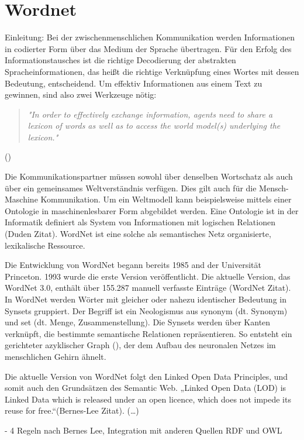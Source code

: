 \section{Wordnet}

Einleitung:
Bei der zwischenmenschlichen Kommunikation werden Informationen in codierter Form über das Medium der Sprache übertragen. Für den Erfolg des Informationstausches ist die richtige Decodierung der abstrakten Spracheinformationen, das heißt die richtige Verknüpfung eines Wortes mit dessen Bedeutung, entscheidend. Um effektiv Informationen aus einem Text zu gewinnen, sind also zwei Werkzeuge nötig:
\begin{quote} \textit{"In order to effectively exchange information, agents need to share a lexicon of words as well as to access the world model(s) underlying the lexicon."}\end{quote} (\cite[vgl.][1]{OLTRAMANI})

Die Kommunikationspartner müssen sowohl über denselben Wortschatz als auch über ein gemeinsames Weltverständnis verfügen. Dies gilt auch für die Mensch-Maschine Kommunikation. Um ein Weltmodell kann beispielsweise mittels einer Ontologie in maschinenlesbarer Form abgebildet werden. Eine Ontologie ist in der Informatik definiert als System von Informationen mit logischen Relationen (Duden Zitat). WordNet ist eine solche als semantisches Netz organisierte, lexikalische Ressource.

Die Entwicklung von WordNet begann bereits 1985 and der Universität Princeton. 1993 wurde die erste Version veröffentlicht. Die aktuelle Version, das WordNet 3.0, enthält über 155.287 manuell verfasste Einträge (WordNet Zitat).
In WordNet werden Wörter mit gleicher oder nahezu identischer Bedeutung in Synsets gruppiert. Der Begriff ist ein Neologismus aus synonym (dt. Synonym) und set (dt. Menge, Zusammenstellung). Die Synsets werden über Kanten verknüpft, die bestimmte semantische Relationen repräsentieren. So entsteht ein gerichteter azyklischer Graph (\cite[vgl.][12]{OLTRAMANI}), der dem Aufbau des neuronalen Netzes im menschlichen Gehirn ähnelt.

Die aktuelle Version von WordNet folgt den Linked Open Data Principles, und somit auch den Grundsätzen des Semantic Web. „Linked Open Data (LOD) is Linked Data which is released under an open licence, which does not impede its reuse for free.“(Bernes-Lee Zitat).  (…)

- 4 Regeln nach Bernes Lee, Integration mit anderen Quellen RDF und OWL

